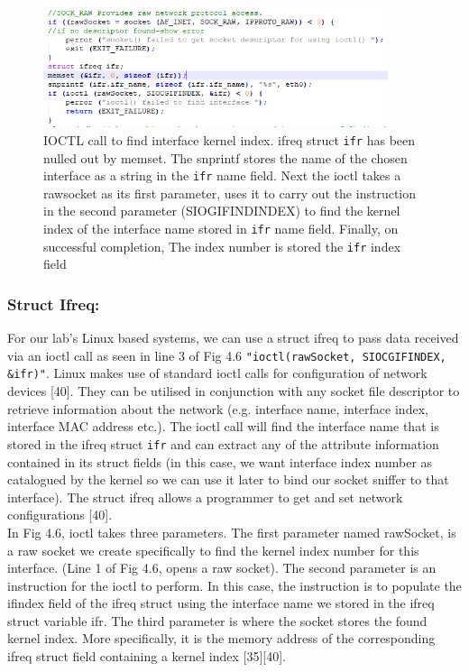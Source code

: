 \documentclass{uathesis}
\begin{document}
\begin{figure}[h!] 
    \centering
    \includegraphics[width=0.9\textwidth]{Struct_ifreq.PNG}
    \caption{IOCTL call to find interface kernel index. ifreq struct {\tt ifr} has been nulled out by memset. The snprintf stores the name of the chosen interface as a string in the {\tt ifr} name field. Next the ioctl takes a rawsocket as its first parameter, uses it to carry out the instruction in the second parameter (SIOGIFINDINDEX) to find the kernel index of the interface name stored in {\tt ifr} name field. Finally, on successful completion, The index number is stored the {\tt ifr} index field}
    \label{fig: http://man7.org/linux/man-pages/man7/netdevice.7.html}
\end{figure}

\subsubsection*{Struct Ifreq:}
For our lab's Linux based systems, we can use a struct ifreq to pass data received via an ioctl call as seen in line 3 of Fig 4.6 {\tt "ioctl(rawSocket, SIOCGIFINDEX, \&ifr)"}. Linux makes use of standard ioctl calls for configuration of network devices [40]. They can be utilised in conjunction with any socket file descriptor to retrieve information about the network (e.g. interface name, interface index, interface MAC address etc.). The ioctl call will find the interface name that is stored in the ifreq struct {\tt ifr} and can extract any of the attribute information contained in its struct fields (in this case, we want interface index number as catalogued by the kernel so we can use it later to bind our socket sniffer to that interface). The struct ifreq allows a programmer to get and set network configurations [40]. \\

In Fig 4.6, ioctl takes three parameters. The first parameter named rawSocket, is a raw socket we create specifically to find the kernel index number for this interface. (Line 1 of Fig 4.6, opens a raw socket). The second parameter is an instruction for the ioctl to perform. In this case, the instruction is to populate the if\textunderscore index field of the ifreq struct using the interface name we stored in the ifreq struct variable ifr. The third parameter is where the socket stores the found kernel index. More specifically, it is the memory address of the corresponding ifreq struct field containing a kernel index [35][40]. \\
\end{document}
